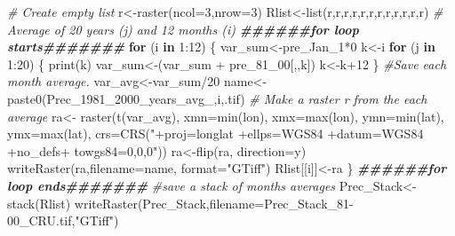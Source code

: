 \documentclass[
  10pt,
  b5paper,
]{book}
\newenvironment{Shaded}{\begin{snugshade}}{\end{snugshade}}
\newcommand{\AttributeTok}[1]{\textcolor[rgb]{0.77,0.63,0.00}{#1}}
\newcommand{\CommentTok}[1]{\textcolor[rgb]{0.56,0.35,0.01}{\textit{#1}}}
\newcommand{\ControlFlowTok}[1]{\textcolor[rgb]{0.13,0.29,0.53}{\textbf{#1}}}
\newcommand{\DecValTok}[1]{\textcolor[rgb]{0.00,0.00,0.81}{#1}}
\newcommand{\DocumentationTok}[1]{\textcolor[rgb]{0.56,0.35,0.01}{\textbf{\textit{#1}}}}
\newcommand{\FunctionTok}[1]{\textcolor[rgb]{0.00,0.00,0.00}{#1}}
\newcommand{\NormalTok}[1]{#1}
\newcommand{\OtherTok}[1]{\textcolor[rgb]{0.56,0.35,0.01}{#1}}
\newcommand{\SpecialCharTok}[1]{\textcolor[rgb]{0.00,0.00,0.00}{#1}}
\newcommand{\StringTok}[1]{\textcolor[rgb]{0.31,0.60,0.02}{#1}}
\begin{document}
\begin{Shaded}
\begin{Highlighting}[]
 \CommentTok{\# Create empty list}
\NormalTok{r}\OtherTok{\textless{}{-}}\FunctionTok{raster}\NormalTok{(}\AttributeTok{ncol=}\DecValTok{3}\NormalTok{,}\AttributeTok{nrow=}\DecValTok{3}\NormalTok{)}
\NormalTok{Rlist}\OtherTok{\textless{}{-}}\FunctionTok{list}\NormalTok{(r,r,r,r,r,r,r,r,r,r,r,r)}
 \CommentTok{\# Average of 20 years (j)  and 12 months (i) }
\DocumentationTok{\#\#\#\#\#\#for loop starts\#\#\#\#\#\#\#}
 \ControlFlowTok{for}\NormalTok{ (i }\ControlFlowTok{in} \DecValTok{1}\SpecialCharTok{:}\DecValTok{12}\NormalTok{) \{ }
\NormalTok{var\_sum}\OtherTok{\textless{}{-}}\NormalTok{pre\_Jan\_1}\SpecialCharTok{*}\DecValTok{0}
\NormalTok{k}\OtherTok{\textless{}{-}}\NormalTok{i}
 \ControlFlowTok{for}\NormalTok{ (j }\ControlFlowTok{in} \DecValTok{1}\SpecialCharTok{:}\DecValTok{20}\NormalTok{) \{}
\FunctionTok{print}\NormalTok{(k)}
\NormalTok{var\_sum}\OtherTok{\textless{}{-}}\NormalTok{(var\_sum }\SpecialCharTok{+}\NormalTok{ pre\_81\_00[,,k])}
\NormalTok{ k}\OtherTok{\textless{}{-}}\NormalTok{k}\SpecialCharTok{+}\DecValTok{12}
\NormalTok{ \}}
\CommentTok{\#Save each month average. }
\NormalTok{ var\_avg}\OtherTok{\textless{}{-}}\NormalTok{var\_sum}\SpecialCharTok{/}\DecValTok{20}
\NormalTok{name}\OtherTok{\textless{}{-}}\FunctionTok{paste0}\NormalTok{(}\StringTok{\textquotesingle{}Prec\_1981\_2000\_years\_avg\_\textquotesingle{}}\NormalTok{,i,}\StringTok{\textquotesingle{}.tif\textquotesingle{}}\NormalTok{)}
 \CommentTok{\# Make a raster r from the each average}
\NormalTok{ra}\OtherTok{\textless{}{-}} \FunctionTok{raster}\NormalTok{(}\FunctionTok{t}\NormalTok{(var\_avg), }\AttributeTok{xmn=}\FunctionTok{min}\NormalTok{(lon), }\AttributeTok{xmx=}\FunctionTok{max}\NormalTok{(lon), }\AttributeTok{ymn=}\FunctionTok{min}\NormalTok{(lat), }\AttributeTok{ymx=}\FunctionTok{max}\NormalTok{(lat), }\AttributeTok{crs=}\FunctionTok{CRS}\NormalTok{(}\StringTok{"+proj=longlat +ellps=WGS84 +datum=WGS84 +no\_defs+ towgs84=0,0,0"}\NormalTok{))}
\NormalTok{ra}\OtherTok{\textless{}{-}}\FunctionTok{flip}\NormalTok{(ra, }\AttributeTok{direction=}\StringTok{\textquotesingle{}y\textquotesingle{}}\NormalTok{)}
\FunctionTok{writeRaster}\NormalTok{(ra,}\AttributeTok{filename=}\NormalTok{name, }\AttributeTok{format=}\StringTok{"GTiff"}\NormalTok{)}
\NormalTok{Rlist[[i]]}\OtherTok{\textless{}{-}}\NormalTok{ra}
\NormalTok{\}}
\DocumentationTok{\#\#\#\#\#\#for loop ends\#\#\#\#\#\#\#}
 \CommentTok{\#save a stack of months averages}
\NormalTok{Prec\_Stack}\OtherTok{\textless{}{-}}\FunctionTok{stack}\NormalTok{(Rlist)}
\FunctionTok{writeRaster}\NormalTok{(Prec\_Stack,}\AttributeTok{filename=}\StringTok{\textquotesingle{}Prec\_Stack\_81{-}00\_CRU.tif\textquotesingle{}}\NormalTok{,}\StringTok{"GTiff"}\NormalTok{)}
\end{Highlighting}
\end{Shaded}
\end{document}
